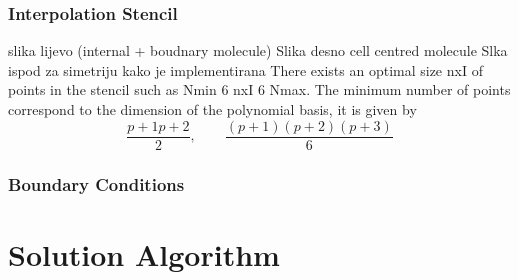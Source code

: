 \documentclass[sn-mathphys,Numbered]{sn-jnl}%
\begin{document}
\subsubsection{Interpolation Stencil}
slika lijevo (internal + boudnary molecule)
Slika desno cell centred molecule
Slka ispod za simetriju kako je implementirana
There exists an optimal size nxI of points in the stencil such as
Nmin 6 nxI 6 Nmax. The minimum number of points correspond to
the dimension of the polynomial basis, it is given by
\begin{equation}
\frac{p+1p+2}{2}, \qquad \frac{(p+1)( p+2)( p+3)}{6}
\end{equation}
%
\subsubsection{Boundary Conditions}
\label{sec:bc}
%


%
%      
\section{Solution Algorithm}
\label{sec:math_model}
%
%


%
\end{document}
